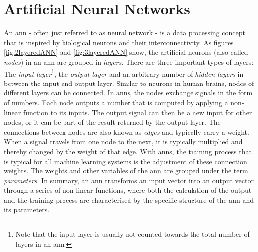 \documentclass[
			   fontsize=11pt,
               paper=a4,
               bibliography=totoc,
               idxtotoc,
               headsepline,
               footsepline,
               footinclude=false,
               BCOR=12mm,
               DIV=13,
               openany,   %
               oneside    %
               ]
               {scrbook}
\begin{document}
\section{Artificial Neural Networks} \label{ssection:ann}

An \acrlong{ann} - often just referred to as neural network - is a data processing concept that is inspired by biological neurons and their interconnectivity. As figures \autoref{fig:2layeredANN} and \autoref{fig:3layeredANN} show, the artificial neurons (also called \textit{nodes}) in an \gls{ann} are grouped in \textit{layers}. There are three important types of layers: The \textit{input layer}\footnote{Note that the input layer is usually not counted towards the total number of layers in an \gls{ann}.}, the \textit{output layer} and an arbitrary number of \textit{hidden layers} in between the input and output layer. Similar to neurons in human brains, nodes of different layers can be connected. In \glspl{ann}, the nodes exchange signals in the form of numbers. Each node outputs a number that is computed by applying a non-linear function to its inputs. The output signal can then be a new input for other nodes, or it can be part of the result returned by the output layer. The connections between nodes are also known as \textit{edges} and typically carry a weight. When a signal travels from one node to the next, it is typically multiplied and thereby changed by the weight of that edge. With \glspl{ann}, the training process that is typical for all machine learning systems is the adjustment of these connection weights. The weights and other variables of the \gls{ann} are grouped under the term \textit{parameters}. In summary, an \gls{ann} transforms an input vector into an output vector through a series of non-linear functions, where both the calculation of the output and the training process are characterised by the specific structure of the \gls{ann} and its parameters.
\end{document}
